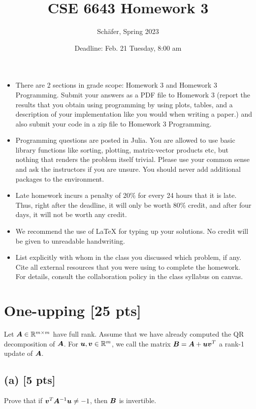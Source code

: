 \documentclass[twoside,10pt]{article}
\begin{document}
\title{CSE 6643 Homework 3}
\author{Sch{\"a}fer, Spring 2023}
\date{Deadline: Feb. 21 Tuesday, 8:00 am}
\maketitle

\begin{itemize}
  \item There are 2 sections in grade scope: Homework 3 and Homework 3 Programming. Submit your answers as a PDF file to Homework 3 (report the results that you obtain using programming by using plots, tables, and a description of your implementation like you would when writing a paper.) and also submit your code in a zip file to Homework 3 Programming. 
  \item Programming questions are posted in Julia. You are allowed to use basic library functions like sorting, plotting, matrix-vector products etc, but nothing that renders the problem itself trivial. Please use your common sense and ask the instructors if you are unsure. 
  You should never add additional packages to the environment.
  \item Late homework incurs a penalty of 20\% for every 24 hours that it is late. Thus, right after the deadline, it will only be worth 80\% credit, and after four days, it will not be worth any credit. 
  \item We recommend the use of LaTeX for typing up your solutions. No credit will be given to unreadable handwriting.
  \item List explicitly with whom in the class you discussed which problem, if any. Cite all external resources that you were using to complete the homework. For details, consult the collaboration policy in the class syllabus on canvas.
\end{itemize}

\section{One-upping [25 pts]}
Let $\bm{A} \in \mathbb{R}^{m \times m}$ have full rank. Assume that we have already computed the QR decomposition of $\bm{A}$.
For $\bm{u}, \bm{v} \in \mathbb{R}^m$, we call the matrix $\bm{B} = \bm{A} + \bm{u}\bm{v}^{T}$ a rank-1 update of $\bm{A}$. 

\subsection*{(a) [5 pts]}
Prove that if $\bm{v}^{T} \bm{A}^{-1} \bm{u} \neq - 1$, then $\bm{B}$ is invertible.
\end{document}

